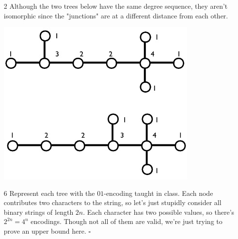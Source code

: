 \documentclass[12pt]{article}
\begin{document}
\begin{enumerate}
      \item[2] Although the two trees below have the same degree sequence,
      they aren't isomorphic since the "junctions" are at a different distance from each other.
      \begin{center}
            \includegraphics[width=10cm]{img/hw3/same_score}
      \end{center}

      \item[6] Represent each tree with the $01$-encoding taught in class.
      Each node contributes two characters to the string, so let's just
      stupidly consider all binary strings of length $2n$.
      Each character has two possible values, so there's $2^{2n}=4^n$ encodings.
      Though not all of them are valid, we're just trying to prove
      an upper bound here. $\square$
\end{enumerate}
\end{document}
